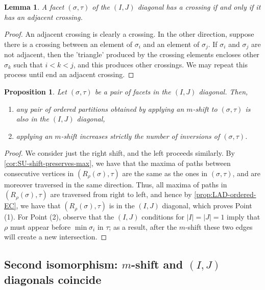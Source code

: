 \documentclass{amsart}
\newtheorem{proposition}[theorem]{Proposition}
\newtheorem{lemma}[theorem]{Lemma}
\theoremstyle{definition}
\begin{document}
\begin{lemma}
    \label{lem:adjacent-crossing}
A facet $(\sigma,\tau)$ of the $(I,J)$ diagonal has a crossing if and only if it has an adjacent crossing.
\end{lemma}

\begin{proof}
An adjacent crossing is clearly a crossing. In the other direction, suppose there is a crossing between an element of $\sigma_i$ and an element of $\sigma_j$. If $\sigma_i$ and $\sigma_j$ are not adjacent, then the 'triangle' produced by the crossing elements encloses other $\sigma_k$ such that $i<k<j$, and this produces other crossings. We may repeat this process until end an adjacent crossing.
\end{proof}

\begin{proposition} 
    \label{lem:IJ-closed-under-shifts}
    Let $(\sigma,\tau)$ be a pair of facets in the $(I,J)$ diagonal.
    Then,
    \begin{enumerate}
        \item any pair of ordered partitions obtained by applying an $m$-shift to $(\sigma,\tau)$ is also in the $(I,J)$ diagonal,
        \item applying an $m$-shift increases strictly the number of inversions of $(\sigma,\tau)$.
    \end{enumerate}
\end{proposition}

\begin{proof}
    We consider just the right shift, and the left proceeds similarly. 
    By \cref{cor:SU-shift-preserves-max}, we have that the maxima of paths between consecutive vertices in $(R_{\rho}(\sigma),\tau)$ are the same as the ones in $(\sigma,\tau)$, and are moreover traversed in the same direction.
    Thus, all maxima of paths in $(R_{\rho}(\sigma),\tau)$ are traversed from right to left, and hence by \cref{prop:LAD-ordered-EC}, we have that $(R_{\rho}(\sigma),\tau)$ is in the $(I,J)$ diagonal, which proves Point (1).
    For Point (2), observe that the $(I,J)$ conditions for $|I|=|J|=1$ imply that $\rho$ must appear before $\min \sigma_i$ in $\tau$; as a result, after the $m$-shift these two edges will create a new intersection.
\end{proof}


\subsection{Second isomorphism: $m$-shift and $(I,J)$ diagonals coincide}
\end{document}
